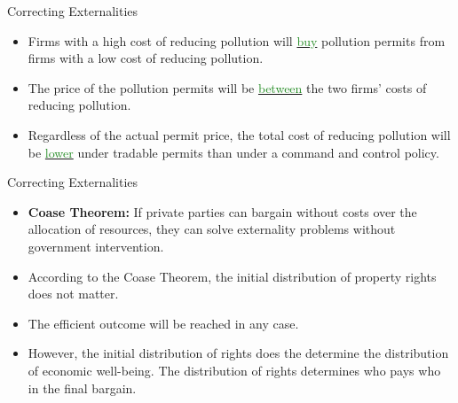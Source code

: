\documentclass[xcolor={dvipsnames},pdf, hyperref={colorlinks=true, citecolor=ForestGreen, linkcolor=BlueViolet, urlcolor=Magenta}]{beamer}
\newcommand{\defn}[1]{\textbf{#1}}
\newcommand{\dd}[1]{{\underline{\textcolor{ForestGreen}{#1}}}}
\begin{document}
\begin{frame}{Correcting Externalities}
	\begin{itemize}
			\item Firms with a high cost of reducing pollution will \dd{buy} pollution permits from firms with a low cost of reducing pollution. 
			\item The price of the pollution permits will be \dd{between} the two firms' costs of reducing pollution. 
			\item Regardless of the actual permit price, the total cost of reducing pollution will be \dd{lower} under tradable permits than under a command and control policy.
	\end{itemize}
\end{frame}

\begin{frame}{Correcting Externalities}
	\begin{itemize}
		\item 	\defn{Coase Theorem:} If private parties can bargain without costs over the allocation of resources, they can solve externality problems without government intervention.
		\item According to the Coase Theorem, the initial distribution of property rights does not matter. 
		\item The efficient outcome will be reached in any case. 
		\item However, the initial distribution of rights does the determine the distribution of economic well-being. The distribution of rights determines who pays who in the final bargain.
	\end{itemize}
\end{frame}
\end{document}
